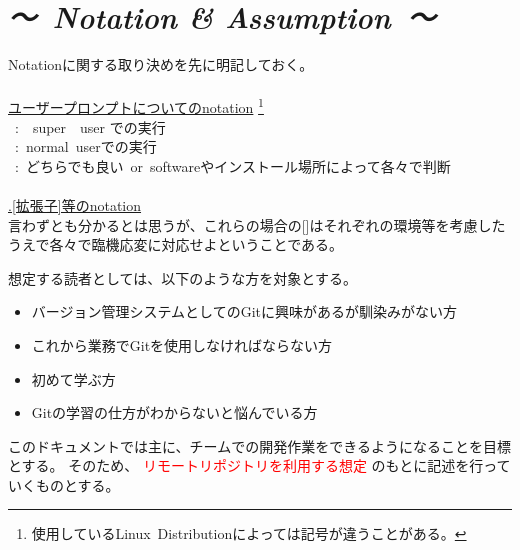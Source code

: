 \documentclass[10pt,a4j,openany,dvipdfmx]{jsarticle}
\begin{document}
\section*{\it {～\ Notation }\rm{\&}\it{ Assumption\ ～}}
Notationに関する取り決めを先に明記しておく。
\\
\\
\underline{ユーザープロンプトについてのnotation}
\footnote{使用しているLinux\ Distributionによっては記号が違うことがある。}\\
\ :\ \ super\ \ user での実行\\
\ :\ normal\ userでの実行\\
\ :\ どちらでも良い\ or\ softwareやインストール場所によって各々で判断
\\
\\
\underline{.[拡張子]等のnotation}\\
言わずとも分かるとは思うが、これらの場合の[]はそれぞれの環境等を考慮したうえで各々で臨機応変に対応せよということである。\newline

想定する読者としては、以下のような方を対象とする。
\begin{itemize}
	\item バージョン管理システムとしてのGitに興味があるが馴染みがない方
	\item これから業務でGitを使用しなければならない方
	\item 初めて学ぶ方
	\item Gitの学習の仕方がわからないと悩んでいる方
\end{itemize}


このドキュメントでは主に、チームでの開発作業をできるようになることを目標とする。
そのため、\textcolor{red}{ リモートリポジトリを利用する想定 }のもとに記述を行っていくものとする。



\end{document}
